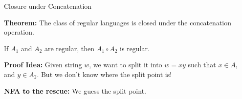 \documentclass[10pt,aspectratio=169]{beamer}
\begin{document}
\begin{frame}{Closure under Concatenation}

\textbf{Theorem:} The class of regular languages is closed under the concatenation operation.

\vspace{1em}

If $A_1$ and $A_2$ are regular, then $A_1 \circ A_2$ is regular.

\vspace{1em}
\pause

\textbf{Proof Idea:} 
Given string $w$, we want to split it into $w = xy$ such that $x \in A_1$ and $y \in A_2$. 
But we don't know where the split point is!

\vspace{1em}
\textbf{NFA to the rescue:} We guess the split point.

\end{frame}
\end{document}

